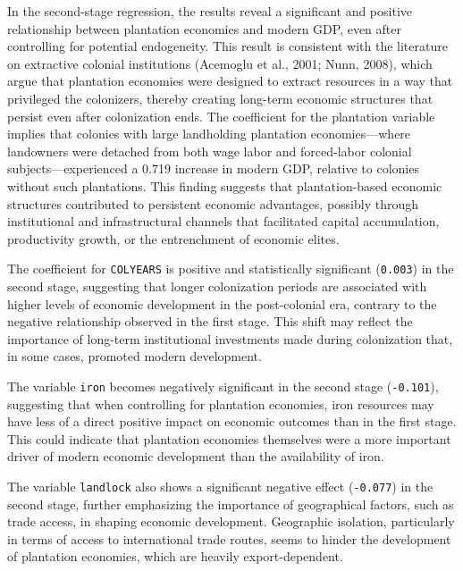 \documentclass[12pt]{article}
\begin{document}
\vspace{0.2 in} 
\noindent In the second-stage regression, the results reveal a significant and positive relationship between plantation economies and modern GDP, even after controlling for potential endogeneity. This result is consistent with the literature on extractive colonial institutions (Acemoglu et al., 2001; Nunn, 2008), which argue that plantation economies were designed to extract resources in a way that privileged the colonizers, thereby creating long-term economic structures that persist even after colonization ends. The coefficient for the plantation variable implies that colonies with large landholding plantation economies—where landowners were detached from both wage labor and forced-labor colonial subjects—experienced a 0.719 increase in modern GDP, relative to colonies without such plantations. This finding suggests that plantation-based economic structures contributed to persistent economic advantages, possibly through institutional and infrastructural channels that facilitated capital accumulation, productivity growth, or the entrenchment of economic elites.

\noindent The coefficient for \texttt{COLYEARS} is positive and statistically significant (\texttt{0.003}) in the second stage, suggesting that longer colonization periods are associated with higher levels of economic development in the post-colonial era, contrary to the negative relationship observed in the first stage. This shift may reflect the importance of long-term institutional investments made during colonization that, in some cases, promoted modern development.

\noindent The variable \texttt{iron} becomes negatively significant in the second stage (\texttt{-0.101}), suggesting that when controlling for plantation economies, iron resources may have less of a direct positive impact on economic outcomes than in the first stage. This could indicate that plantation economies themselves were a more important driver of modern economic development than the availability of iron.

\noindent The variable \texttt{landlock} also shows a significant negative effect (\texttt{-0.077}) in the second stage, further emphasizing the importance of geographical factors, such as trade access, in shaping economic development. Geographic isolation, particularly in terms of access to international trade routes, seems to hinder the development of plantation economies, which are heavily export-dependent.
\end{document}
